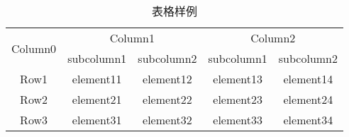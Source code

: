 \documentclass[doctor, vlined]{DissertUESTC}
\begin{document}
	\begin{table}[htbp]
		\captionsetup{list=no}%
		\caption{表格样例}
		\begin{tabular}{ccccc}
			\toprule
			\multirow{2}{*}{Column0} &  \multicolumn{2}{c}{Column1\tnote{1}} & \multicolumn{2}{c}{Column2\tnote{2}} \\
			\cmidrule(lr){2-3}\cmidrule(l){4-5}
			~     & subcolumn1 & subcolumn2 & subcolumn1 & subcolumn2 \\
			\midrule
			Row1  & element11 & element12 &element13 & element14 \\
			Row2  & element21 & element22 &element23 & element24 \\
			\cmidrule{2-3}\cmidrule{4-5}
			Row3  & element31 & element32 &element33 & element34 \\
			\bottomrule
		\end{tabular}
	\end{table}




\end{document}
